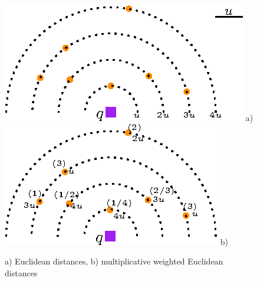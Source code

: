 \documentclass[11pt,onecolumn]{elsart3p}
\begin{document}
        \begin{figure}[h]
        \begin{center}
        \includegraphics[width=0.4\linewidth]{img/knnExample.eps} \hspace{-0.5em} a) %
        \qquad
        \includegraphics[width=0.4\linewidth]{img/knnExampleWeights.eps} \; b)
        \caption{a) Euclidean distances, b) multiplicative weighted Euclidean distances}
        \label{fig:k-dissimilarity}
        \end{center}
        \end{figure}\vspace{1em}
\end{document}
